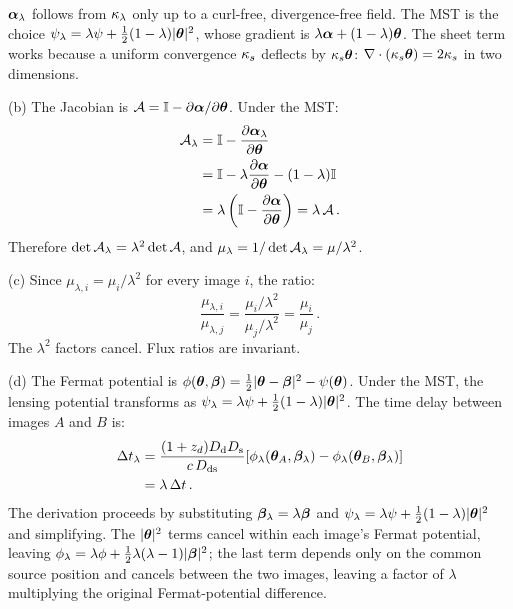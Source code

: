 \begin{annotation}
$\boldsymbol{\alpha}_\lambda$ follows from $\kappa_\lambda$ only up to a curl-free,
divergence-free field.  The MST is the choice $\psi_\lambda = \lambda\psi +
\tfrac12(1-\lambda)|\boldsymbol{\theta}|^2$, whose gradient is
$\lambda\boldsymbol{\alpha} + (1-\lambda)\boldsymbol{\theta}$.  The sheet term works because a
uniform convergence $\kappa_s$ deflects by $\kappa_s\boldsymbol{\theta}$:
$\nabla\cdot(\kappa_s\boldsymbol{\theta}) = 2\kappa_s$ in two dimensions.
\end{annotation}


(b) The Jacobian is
$\mathcal{A} = \mathbb{I} - \partial\boldsymbol{\alpha}/\partial\boldsymbol{\theta}$.
Under the MST:
\begin{align*}
    \mathcal{A}_\lambda
    &= \mathbb{I}
       - \frac{\partial\boldsymbol{\alpha}_\lambda}{\partial\boldsymbol{\theta}} \\
    &= \mathbb{I} - \lambda\frac{\partial\boldsymbol{\alpha}}{\partial\boldsymbol{\theta}}
       - (1-\lambda)\mathbb{I} \\
    &= \lambda\left(\mathbb{I}
       - \frac{\partial\boldsymbol{\alpha}}{\partial\boldsymbol{\theta}}\right)
    = \lambda\,\mathcal{A} \,.
\end{align*}
Therefore $\det\mathcal{A}_\lambda = \lambda^2\det\mathcal{A}$, and
$\mu_\lambda = 1/\det\mathcal{A}_\lambda = \mu/\lambda^2$. \checkmark

(c) Since $\mu_{\lambda,i} = \mu_i/\lambda^2$ for every
image $i$, the ratio:
\begin{equation*}
    \frac{\mu_{\lambda,i}}{\mu_{\lambda,j}}
    = \frac{\mu_i/\lambda^2}{\mu_j/\lambda^2}
    = \frac{\mu_i}{\mu_j} \,.
\end{equation*}
The $\lambda^2$ factors cancel.  Flux ratios are invariant. \checkmark

(d) The Fermat potential is
$\phi(\boldsymbol{\theta}, \boldsymbol{\beta}) = \frac{1}{2}|\boldsymbol{\theta} - \boldsymbol{\beta}|^2
- \psi(\boldsymbol{\theta})$.  Under the MST, the lensing potential
transforms as $\psi_\lambda = \lambda\psi +
\frac{1}{2}(1-\lambda)|\boldsymbol{\theta}|^2$.  The time delay between
images $A$ and $B$ is:
\begin{align*}
    \Delta t_\lambda
    &= \frac{(1+z_d)D_{\mathrm{d}}D_{\mathrm{s}}}{c\,D_{\mathrm{ds}}}
       [\phi_\lambda(\boldsymbol{\theta}_A, \boldsymbol{\beta}_\lambda)
        - \phi_\lambda(\boldsymbol{\theta}_B, \boldsymbol{\beta}_\lambda)] \\
    &= \lambda\,\Delta t \,.
\end{align*}
The derivation proceeds by substituting $\boldsymbol{\beta}_\lambda =
\lambda\boldsymbol{\beta}$ and $\psi_\lambda = \lambda\psi +
\frac{1}{2}(1-\lambda)|\boldsymbol{\theta}|^2$ and simplifying.  The
$|\boldsymbol{\theta}|^2$ terms cancel within each image's Fermat potential,
leaving $\phi_\lambda = \lambda\phi + \tfrac12\lambda(\lambda-1)|\boldsymbol{\beta}|^2$;
the last term depends only on the common source position and
cancels between the two images, leaving a factor of $\lambda$
multiplying the original Fermat-potential difference. \checkmark

